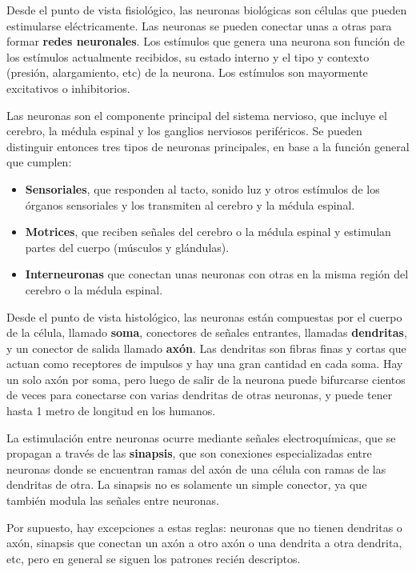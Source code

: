 Desde el punto de vista fisiológico, las neuronas biológicas son células que pueden estimularse eléctricamente. Las neuronas se pueden conectar unas a otras para formar \textbf{redes neuronales}. Los estímulos que genera una neurona son función de los estímulos actualmente recibidos, su estado interno y el tipo y contexto (presión, alargamiento, etc) de la neurona. Los estímulos son mayormente excitativos o inhibitorios. 

Las neuronas son el componente principal del sistema nervioso, que incluye el cerebro, la médula espinal y los ganglios nerviosos periféricos. Se pueden distinguir entonces tres tipos de neuronas principales, en base a la función general que cumplen:

\begin{itemize}
 \item \textbf{Sensoriales}, que responden al tacto, sonido luz y otros estímulos de los órganos sensoriales y los transmiten al cerebro y la médula espinal.
 \item \textbf{Motrices}, que reciben señales del cerebro o la médula espinal y estimulan partes del cuerpo (músculos y glándulas). 
 \item \textbf{Interneuronas} que conectan unas neuronas con otras en la misma región del cerebro o la médula espinal.
\end{itemize}

Desde el punto de vista histológico, las neuronas están compuestas por el cuerpo de la célula, llamado \textbf{soma}, conectores de señales entrantes, llamadas \textbf{dendritas}, y un conector de salida llamado \textbf{axón}. Las dendritas son fibras finas  y cortas que actuan como receptores de impulsos y hay una gran cantidad en cada soma. Hay un solo axón por soma, pero luego de salir de la neurona puede bifurcarse cientos de veces para conectarse con varias dendritas de otras neuronas, y puede tener hasta 1 metro de longitud en los humanos.


La estimulación entre neuronas ocurre mediante señales electroquímicas, que se propagan a través de las \textbf{sinapsis}, que son conexiones especializadas entre neuronas donde se encuentran ramas del axón de una célula con ramas de las dendritas de otra. La sinapsis no es solamente un simple conector, ya que también modula las señales entre neuronas.

Por supuesto, hay excepciones a estas reglas: neuronas que no tienen dendritas o axón, sinapsis que conectan un axón a otro axón o una dendrita a otra dendrita, etc, pero en general se siguen los patrones recién descriptos.

